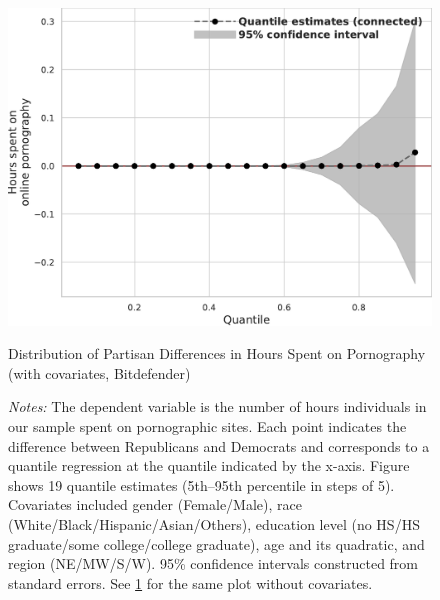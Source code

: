 \documentclass[12pt,twoside]{article}
\begin{document}
\begin{figure}[ht]
	\centering
	\includegraphics[width=.6\linewidth]{figs/alphamountain_quantile_reg_covariates_duration_adult.pdf}
	\caption{Distribution of Partisan Differences in Hours Spent on Pornography (with covariates, Bitdefender)}
	\caption*{\footnotesize \emph{Notes:} 
		The dependent variable is the number of hours individuals in our sample spent on pornographic sites. Each point indicates the difference between Republicans and Democrats and corresponds to a quantile regression at the quantile indicated by the x-axis. Figure shows 19 quantile estimates (5th--95th percentile in steps of 5). Covariates included gender (Female/Male), race (White/Black/Hispanic/Asian/Others), education level (no HS/HS graduate/some college/college graduate), age and its quadratic, and region (NE/MW/S/W). 95\% confidence intervals constructed from standard errors. See \cref{fig:alphamountain_quantile_regression_duration_covariates} for the same plot without covariates.
	}
	\label{fig:alphamountain_quantile_regression_duration_covariates}
\end{figure}


\setcounter{table}{0}
\setcounter{figure}{0}
\setcounter{equation}{0}
\FloatBarrier
\renewcommand{\thetable}{F\arabic{table}}
\renewcommand{\thefigure}{F\arabic{figure}}
\renewcommand{\theequation}{F\arabic{equation}}
\end{document}
